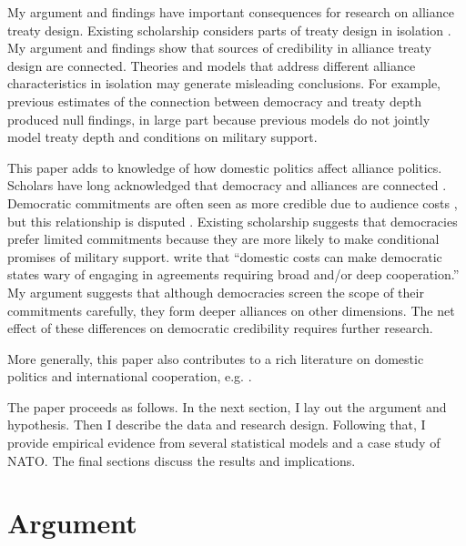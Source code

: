 \documentclass[12pt]{article}
\begin{document}
My argument and findings have important consequences for research on alliance treaty design. 
Existing scholarship considers parts of treaty design in isolation \citep{Benson2012, Mattes2012, Chibaetal2015}. 
My argument and findings show that sources of credibility in alliance treaty design are connected. 
Theories and models that address different alliance characteristics in isolation may generate misleading conclusions. 
For example, previous estimates of the connection between democracy and treaty depth produced null findings, in large part because previous models do not jointly model treaty depth and conditions on military support. 


This paper adds to knowledge of how domestic politics affect alliance politics. 
Scholars have long acknowledged that democracy and alliances are connected \citep{LaiReiter2000, GiblerWolford2006, Warren2016, McManusYarhi-Milo2017}. 
Democratic commitments are often seen as more credible due to audience costs \citep{Gaubatz1996, DigiuseppePoast2016}, but this relationship is disputed \citep{GartzkeGleditsch2004}. 
Existing scholarship suggests that democracies prefer limited commitments \citep{Mattes2012, Chibaetal2015} because they are more likely to make conditional promises of military support. 
\citet{Chibaetal2015} write that ``domestic costs can make democratic states wary of engaging in agreements requiring broad and/or deep cooperation.'' 
My argument suggests that although democracies screen the scope of their commitments carefully, they form deeper alliances on other dimensions.  
The net effect of these differences on democratic credibility requires further research. 


More generally, this paper also contributes to a rich literature on domestic politics and international cooperation, e.g. \citep{DownesRocke1995, Fearon1998, Leeds1999, MattesRodriguez2014}. 


The paper proceeds as follows. 
In the next section, I lay out the argument and hypothesis. 
Then I describe the data and research design. 
Following that, I provide empirical evidence from several statistical models and a case study of NATO. 
The final sections discuss the results and implications. 


\section{Argument}
\end{document}
